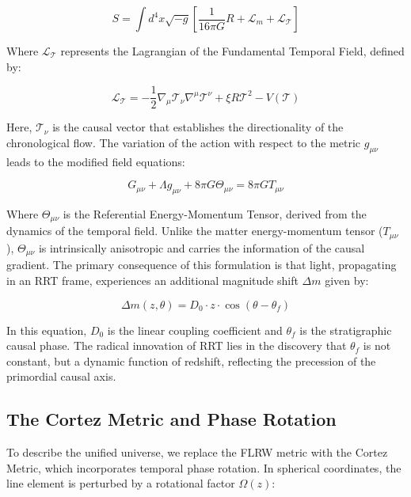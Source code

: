 \documentclass[12pt, a4paper]{article}
\begin{document}
\begin{equation}
S = \int d^4x \sqrt{-g} \left[ \frac{1}{16\pi G} R + \mathcal{L}_m + \mathcal{L}_{\mathcal{T}} \right]
\end{equation}

Where $\mathcal{L}_{\mathcal{T}}$ represents the Lagrangian of the Fundamental Temporal Field, defined by:

\begin{equation}
\mathcal{L}_{\mathcal{T}} = -\frac{1}{2} \nabla_\mu \mathcal{T}_ \nu \nabla^\mu \mathcal{T}^\nu + \xi R \mathcal{T}^2 - V(\mathcal{T})
\end{equation}

Here, $\mathcal{T}_\nu$ is the causal vector that establishes the directionality of the chronological flow. The variation of the action with respect to the metric $g_{\mu\nu}$ leads to the modified field equations:

\begin{equation}
G_{\mu\nu} + \Lambda g_{\mu\nu} + 8\pi G \Theta_{\mu\nu} = 8\pi G T_{\mu\nu}
\end{equation}

Where $\Theta_{\mu\nu}$ is the Referential Energy-Momentum Tensor, derived from the dynamics of the temporal field. Unlike the matter energy-momentum tensor ($T_{\mu\nu}$), $\Theta_{\mu\nu}$ is intrinsically anisotropic and carries the information of the causal gradient. The primary consequence of this formulation is that light, propagating in an RRT frame, experiences an additional magnitude shift $\Delta m$ given by:

\begin{equation}
\Delta m(z, \theta) = D_0 \cdot z \cdot \cos(\theta - \theta_{f})
\end{equation}

In this equation, $D_0$ is the linear coupling coefficient and $\theta_{f}$ is the stratigraphic causal phase. The radical innovation of RRT lies in the discovery that $\theta_{f}$ is not constant, but a dynamic function of redshift, reflecting the precession of the primordial causal axis.

\subsection{The Cortez Metric and Phase Rotation}

To describe the unified universe, we replace the FLRW metric with the Cortez Metric, which incorporates temporal phase rotation. In spherical coordinates, the line element is perturbed by a rotational factor $\Omega(z)$:
\end{document}
